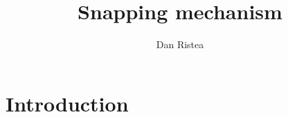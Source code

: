 \documentclass[orivec,envcountsame]{llncs}
\title{Snapping mechanism}
\author{Dan Ristea}
\institute{
  University College London, \email{dan.ristea.19@ucl.ac.uk}
}
\begin{document}
\maketitle

\pagebreak
\section{Introduction}
\newpage


\end{document}
